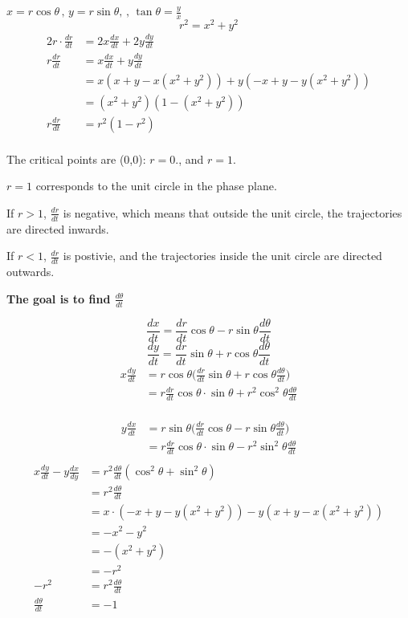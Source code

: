 \documentclass[letterpaper,12pt]{article}
\begin{document}
$x = r\cos\theta\,,\, y = r\sin\theta, \,,\, \tan\theta = \frac{y}{x}$
\[
    r^2 = x^2 + y^2
\]
\begin{align*}
    2r \cdot \frac{dr}{dt} &= 2x \frac{dx}{dt} + 2y \frac{dy}{dt}\\
                           r \frac{dr}{dt}&= x \frac{dx}{dt} + y \frac{dy}{dt}\\
                           &= x(x+y - x(x^2 + y^2)) + y(-x+y-y(x^2+y^2))\\
                         &= (x^2 + y^2)(1-(x^2+y^2))\\
                         r \frac{dr}{dt}&= r^2(1-r^2)\\
\end{align*}


The critical points are (0,0): $r=0$., and $r=1$.


$r=1$ corresponds to the unit circle in the phase plane.


If $r > 1$, $\frac{dr}{dt}$ is negative, which means that outside the unit circle, the trajectories
are directed inwards.


If $r < 1$, $\frac{dr}{dt}$ is postivie, and the trajectories inside the unit circle are directed
outwards.


\textbf{The goal is to find $\frac{d\theta}{dt}$}

\[
    \frac{dx}{dt} = \frac{dr}{dt}\cos\theta - r\sin\theta \frac{d\theta}{dt}
\]
\[
    \frac{dy}{dt} = \frac{dr}{dt}\sin\theta + r\cos\theta \frac{d\theta}{dt}
\]
\begin{align*}
    x \frac{dy}{dt} &= r\cos\theta\bigg(\frac{dr}{dt}\sin\theta+r\cos\theta \frac{d\theta}{dt}\bigg)\\
                    &= r \frac{dr}{dt} \cos\theta \cdot \sin\theta + r^2 \cos^2\theta \frac{d\theta}{dt}\\
\end{align*}

\begin{align*}
    y\frac{dx}{dt} &= r\sin\theta\bigg(\frac{dr}{dt}\cos\theta-r\sin\theta \frac{d\theta}{dt}\bigg)\\
                    &= r \frac{dr}{dt} \cos\theta \cdot \sin\theta - r^2 \sin^2\theta \frac{d\theta}{dt}\\
\end{align*}
\begin{align*}
    x \frac{dy}{dt} - y \frac{dx}{dy} &= r^2 \frac{d\theta}{dt} (\cos^2\theta + \sin^2\theta)\\
                                      &= r^2 \frac{d\theta}{dt}\\
                                      &= x \cdot (-x+y-y(x^2+y^2)) - y(x+y-x(x^2+y^2))\\
                                      &= -x^2 - y^2\\
                                      &= -(x^2 + y^2)\\
                                      &= -r^2\\
                                     -r^2 &= r^2 \frac{d\theta}{dt}\\
                                     \frac{d\theta}{dt} &= -1
\end{align*}
\end{document}
